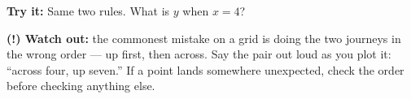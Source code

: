 \documentclass[12pt]{article}
\begin{document}
\begin{tryitbox}
\textbf{Try it:} \quad Same two rules. What is $y$ when $x = 4$?\\[2pt]
\end{tryitbox}

\begin{watchoutbox}
\textbf{(!) Watch out:} the commonest mistake on a grid is doing the two journeys in the
wrong order --- up first, then across. Say the pair out loud as you plot it: ``across four,
up seven.'' If a point lands somewhere unexpected, check the order before checking
anything else.
\end{watchoutbox}
\end{document}
